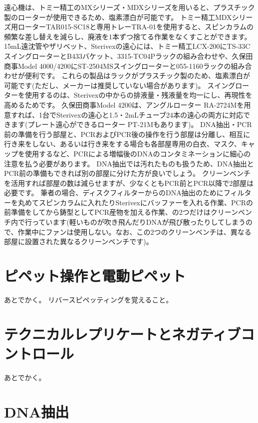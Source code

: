 \documentclass[titlepage,10pt,a4paper,uplatex]{jsbook}
\begin{document}
遠心機は、トミー精工のMXシリーズ・MDXシリーズを用いると、プラスチック製のローターが使用できるため、塩素漂白が可能です。
トミー精工MDXシリーズ用ローターTAR015-SC18と専用トレーTRA-01を使用すると、スピンカラムの頻繁な差し替えを減らし、廃液を1本ずつ捨てる作業をなくすことができます。
15mL遠沈管やザリベット、Sterivexの遠心には、トミー精工LCX-200にTS-33CスイングローターとB433バケット、3315-TC04Pラックの組み合わせや、久保田商事Model 4000/4200にST-2504MSスイングローターと055-1160ラックの組み合わせが便利です。
これらの製品はラックがプラスチック製のため、塩素漂白が可能です(ただし、メーカーは推奨していない場合があります)。
スイングローターを使用するのは、Sterivexの中からの排液量・残液量を均一にし、再現性を高めるためです。
久保田商事Model 4200は、アングルローター RA-2724Mを用意すれば、1台でSterivexの遠心と1.5・2mLチューブ24本の遠心の両方に対応できます(プレート遠心ができるローター PT-21Mもあります)。
DNA抽出・PCR前の準備を行う部屋と、PCRおよびPCR後の操作を行う部屋は分離し、相互に行き来をしない、あるいは行き来をする場合も各部屋専用の白衣、マスク、キャップを使用するなど、PCRによる増幅後のDNAのコンタミネーションに細心の注意を払う必要があります。
DNA抽出では汚れたものも扱うため、DNA抽出とPCR前の準備もできれば別の部屋に分けた方が良いでしょう。
クリーンベンチを活用すれば部屋の数は減らせますが、少なくともPCR前とPCR以降で2部屋は必要です。
筆者の場合、ディスクフィルターからのDNA抽出のためにフィルターを丸めてスピンカラムに入れたりSterivexにバッファーを入れる作業、PCRの前準備をしてから鋳型としてPCR産物を加える作業、の2つだけはクリーンベンチ内で行っています(軽いものが吹き飛んだりDNAが飛び散ったりしてしまうので、作業中にファンは使用しない。なお、この2つのクリーンベンチは、異なる部屋に設置された異なるクリーンベンチです)。

\section{ピペット操作と電動ピペット}

あとでかく。
リバースピペッティングを覚えること。

\section{テクニカルレプリケートとネガティブコントロール}

あとでかく。

\section{DNA抽出}
\end{document}
